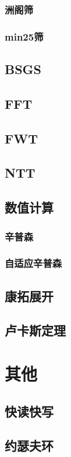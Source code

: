 \documentclass[twocolumn,a4]{article}
\newcommand{\addcpp}[1]{}
\begin{document}
		\subsubsection{洲阁筛}
		\subsubsection{min25筛}
	\subsection{BSGS}
	\subsection{FFT}
	\subsection{FWT}
	\subsection{NTT}
	\subsection{数值计算}
		\subsubsection{辛普森}
		\subsubsection{自适应辛普森}
			\addcpp{math/adaptive_simpson}
	\subsection{康拓展开}
	\subsection{卢卡斯定理}

\section{其他}
	\subsection{快读快写}
	\subsection{约瑟夫环}
\end{document}
